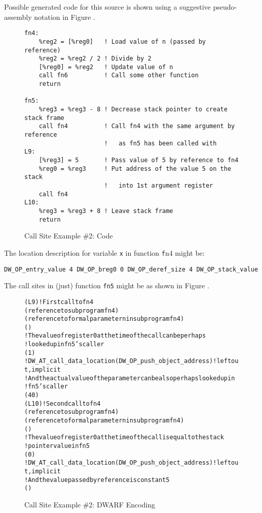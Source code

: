 Possible generated code for this source is shown using a suggestive 
pseudo-\linebreak[0]assembly notation in Figure .
\begin{figure}
\begin{lstlisting}
fn4:
    %reg2 = [%reg0]   ! Load value of n (passed by reference)
    %reg2 = %reg2 / 2 ! Divide by 2
    [%reg0] = %reg2   ! Update value of n
    call fn6          ! Call some other function
    return

fn5:
    %reg3 = %reg3 - 8 ! Decrease stack pointer to create stack frame
    call fn4          ! Call fn4 with the same argument by reference 
                      !   as fn5 has been called with
L9:
    [%reg3] = 5       ! Pass value of 5 by reference to fn4
    %reg0 = %reg3     ! Put address of the value 5 on the stack
                      !   into 1st argument register
    call fn4
L10:
    %reg3 = %reg3 + 8 ! Leave stack frame
    return
\end{lstlisting}
\caption{Call Site Example \#2: Code}
\label{fig:callsiteexample2code}
\end{figure}

The location description for variable \texttt{x} in function 
\texttt{f}n4 might be:
\begin{lstlisting}
DW_OP_entry_value 4 DW_OP_breg0 0 DW_OP_deref_size 4 DW_OP_stack_value
\end{lstlisting}

The call sites in (just) function \texttt{fn5} might be as shown in 
Figure .

\begin{figure}
\begin{dwflisting}
\begin{alltt}
\DWTAGcallsite
    \DWATcallreturnpc(L9) ! First call to fn4
    \DWATcallorigin(reference to subprogram fn4)
    \DWTAGcallsiteparameter
        \DWATcallparameter(reference to formal parameter n in subprogram fn4)
        \DWATlocation(\DWOPregzero)
        ! The value of register 0 at the time of the call can be perhaps 
        !   looked up in fn5's caller
        \DWATcallvalue(\DWOPentryvalue{} 1 \DWOPregzero)
        ! DW_AT_call_data_location(DW_OP_push_object_address) ! left out, implicit
        ! And the actual value of the parameter can be also perhaps looked up in
        ! fn5's caller
        \DWATcalldatavalue(\DWOPentryvalue{} 4 \DWOPbregzero{} 0 )
\DWTAGcallsite
    \DWATcallreturnpc(L10) ! Second call to fn4
    \DWATcallorigin(reference to subprogram fn4)
    \DWTAGcallsiteparameter
        \DWATcallparameter(reference to formal parameter n in subprogram fn4)
        \DWATlocation(\DWOPregzero)
        ! The value of register 0 at the time of the call is equal to the stack
        ! pointer value in fn5
        \DWATcallvalue(\DWOPbregthree{} 0)
        ! DW_AT_call_data_location(DW_OP_push_object_address) ! left out, implicit
        ! And the value passed by reference is constant 5
        \DWATcalldatavalue(\DWOPlitfive)
\end{alltt}
\end{dwflisting}
\caption{Call Site Example \#2: DWARF Encoding}
\label{fig:callsiteexample2dwarf}
\end{figure}